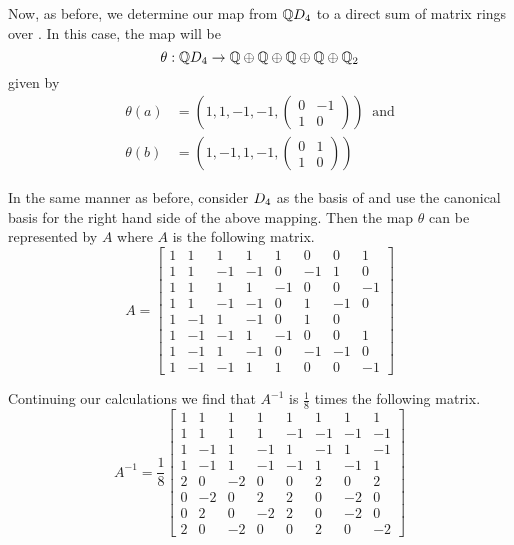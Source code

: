 \documentclass[11pt]{report}
\begin{document}
Now, as before, we determine our map from $ \mathbb{Q}{}D_4{}$
 to a direct sum of 
matrix rings over \rat. In this case, the map will be
\[
\theta: \mathbb{Q} D_4{} \to  \mathbb{Q}\oplus \mathbb{Q}\oplus \mathbb{Q}\oplus \mathbb{Q}\oplus \mathbb{Q}_2
\]
given by
\begin{align*}
\theta(a) &=\left(1,1,-1,-1,
\begin{pmatrix}
0 &-1\\
1&0
\end{pmatrix} \right) \ \textrm{ and} \\
\theta(b) &=\left(1,-1,1,-1,
\begin{pmatrix}
0 &1\\
1&0
\end{pmatrix} \right) 
\end{align*}

In the same manner as before, consider $D_4{}$ as the basis of
\rat\dfr{} and use the canonical basis for the right hand side of the
above mapping. Then the map $\theta$ can be represented by $A$ where 
$A$
is the following matrix.
\[
A=\begin{bmatrix}
1&1&1&1&1&0&0&1\\
1& 1&        -1&      -1&      0&       -1&      1&       0\\
1& 1&         1&       1&       -1&      0&       0&       -1\\
1& 1&        -1&      -1&      0&       1&       -1&      0\\
1& -1&        1&       -1&      0&               1&     0\\
1& -1&        -1&      1&       -1&      0&       0&       1\\
1& -1&        1&       -1&      0&       -1&      -1&      0\\
1& -1&        -1&      1&       1&       0&       0&       -1
\end{bmatrix}
\]

Continuing our calculations we find that $A^{-1}$ is $\frac{1}{8}$
 times the
following matrix.
\[A^{-1} = \frac{1}{8}\begin{bmatrix}
1&1&1&1&1&1&1&1\\
1&1&1&1&-1&-1&-1&-1\\
1&-1&1&-1&1&-1&1&-1\\
1&-1&1&-1&-1&1&-1&1\\
        2& 0&     -2&      0&       0& 2& 0& 2\\
        0& -2&    0&       2&       2&  0&    -2&      0\\
        0&  2&    0&       -2&      2&  0&    -2&      0\\
        2&  0&    -2&      0&       0&  2&    0&       -2
\end{bmatrix}
\]
\end{document}
